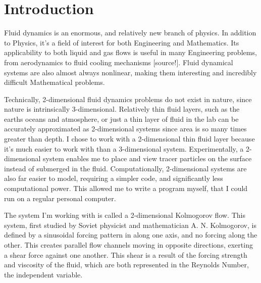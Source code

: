 		

      \chapter*{Introduction}

	
	Fluid dynamics is an enormous, and relatively new branch of physics.  In addition to Physics, it's a field of interest for both Engineering and Mathematics.  Its applicability to both liquid and gas flows is useful in many Engineering problems, from aerodynamics to fluid cooling mechanisms [source!].  Fluid dynamical systems are also almost always nonlinear, making them interesting and incredibly difficult Mathematical problems.

	Technically, 2-dimensional fluid dynamics problems do not exist in nature, since nature is intrinsically 3-dimensional.  Relatively thin fluid layers, such as the earths oceans and atmosphere, or just a thin layer of fluid in the lab can be accurately approximated as 2-dimensional systems since area is so many times greater than depth.  I chose to work with a 2-dimensional thin fluid layer because it's much easier to work with than a 3-dimensional system.  Experimentally, a 2-dimensional system enables me to place and view tracer particles on the surface instead of submerged in the fluid.  Computationally, 2-dimensional systems are also far easier to model, requiring a simpler code, and  significantly less computational power.  This allowed me to write a program myself, that I could run on a regular personal computer.
	
	  The system I'm working with is called a 2-dimensional Kolmogorov flow.  This system, first studied by Soviet physicist and mathematician A. N. Kolmogorov, is defined by a sinusoidal forcing pattern in along one axis, and no forcing along the other.  This creates parallel flow channels moving in opposite directions, exerting a shear force against one another.  This shear is a result of the forcing strength and viscosity of the fluid, which are both represented in the Reynolds Number, the independent variable.
	

